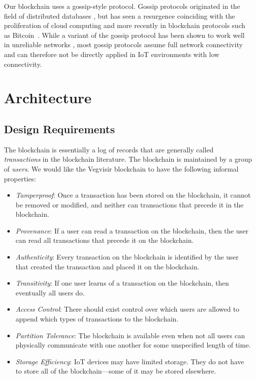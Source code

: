 \documentclass[conference, letterpaper]{IEEEtran}
\begin{document}
Our blockchain uses a gossip-style protocol.  Gossip protocols originated in the field of distributed databases \cite{demers_epidemic_1987}, but has seen a resurgence coinciding with the proliferation of cloud computing \cite{lim_byzantine-resilient_2017,chuat_efficient_2015,chandra_anonymous_2001} and more recently in blockchain protocols such as Bitcoin~\cite{koshy_analysis_2014}. While a variant of the gossip protocol has been shown to work well in unreliable networks \cite{terry1995managing}, most gossip protocols assume full network connectivity and can therefore not be directly applied in IoT environments with low connectivity.


\section{Architecture}
\label{sec:architecture}

\subsection{Design Requirements}

The blockchain is essentially a log of records that are generally called \emph{transactions} in the blockchain literature.  The blockchain is maintained by a group of \emph{users}.  We would like the Vegvisir blockchain to have the following informal properties:

\begin{itemize}
\item \emph{Tamperproof}: Once a transaction has been stored on the blockchain, it cannot
be removed or modified, and neither can transactions that precede it in the blockchain.
\item \emph{Provenance}: If a user can read a transaction on the blockchain, then the user can read all transactions that precede it on the blockchain.
\item \emph{Authenticity}: Every transaction on the blockchain is identified by the user that created the transaction and placed it on the blockchain.
\item \emph{Transitivity}: If one user learns of a transaction on the blockchain, then eventually all users do.
\item \emph{Access Control}: There should exist control over which users are allowed to append which types of transactions to the blockchain.
\item \emph{Partition Tolerance}: The blockchain is available even when not all users
can physically communicate with one another for some unspecified length of time.
\item \emph{Storage Efficiency}: IoT devices may have limited storage.  They do not have to
store all of the blockchain---some of it may be stored elsewhere.
\end{itemize}
\end{document}
